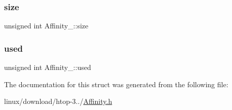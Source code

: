 \mbox{\label{structAffinity___ab772334a1fd2e47a032a10db2a1e3064}} 
\subsubsection{\texorpdfstring{size}{size}}
{\footnotesize\ttfamily unsigned int Affinity\+\_\+\+::size}

\mbox{\label{structAffinity___afd246beb737889223e76a1717de24717}} 
\subsubsection{\texorpdfstring{used}{used}}
{\footnotesize\ttfamily unsigned int Affinity\+\_\+\+::used}



The documentation for this struct was generated from the following file\+:\begin{DoxyCompactItemize}
\item 
linux/download/htop-\/3../\hyperlink{Affinity_8h}{Affinity.\+h}\end{DoxyCompactItemize}
